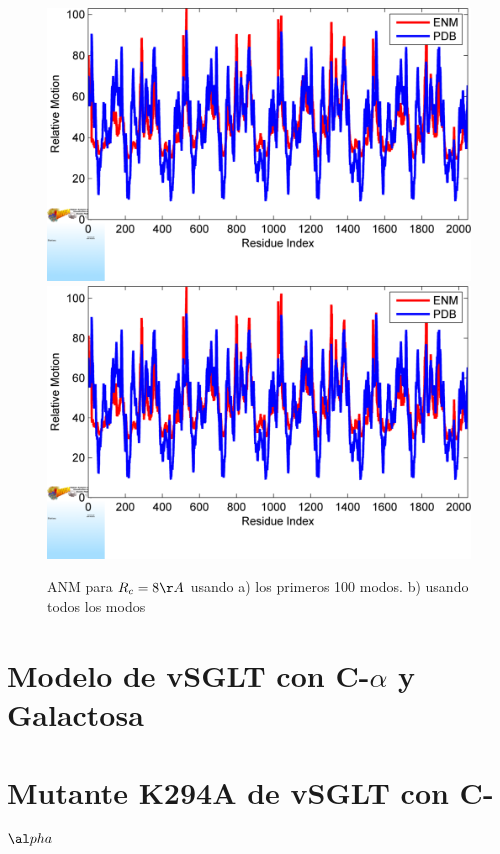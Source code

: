 \begin{figure}
 \centering
  \includegraphics[scale=0.3]{./Kap4/ANM/Ca/BF_plot_100.png}
 \includegraphics[scale=0.3]{./Kap4/ANM/Ca/BF_plot.png}
 \caption{ANM para $R_c=8\AA$ usando a) los primeros 100 modos. b) usando todos los modos}
\end{figure}
\section{Modelo de vSGLT con C-$\alpha$ y Galactosa}

\section{Mutante K294A de vSGLT con C-$\al pha$}